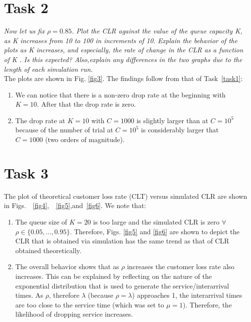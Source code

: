 \documentclass[10pt]{article}
\newcommand{\tion}[1]{Task~\ref{#1}}
\begin{document}
\section{Task 2}
\label{task2}



\textit{Now let us fix $\rho = 0.85$. Plot the CLR against the value of the queue capacity K, as K increases from 10 to 100 in increments of 10. Explain the behavior of the plots as K increases, and especially, the rate of change in the CLR as a function of K . Is this expected? Also,explain any differences in the two graphs due to the length of each simulation run.} \\
The plots are shown in Fig. \ref{fig3}. The findings follow from that of \tion{task1}: 
\begin{enumerate}
 \item We can notice that there is a non-zero drop rate at the beginning with $K=10$. After that the drop rate is zero.
 \item The drop rate at $K=10$ with $C=1000$ is slightly larger than at $C=10^5$ because of the number of trial at $C=10^5$ is considerably larger that $C=1000$ (two orders of magnitude).
\end{enumerate}

\section{Task 3}
\label{task3}


The plot of theoretical customer loss rate (CLT) versus simulated CLR are shown in Figs.~~\ref{fig4},~~\ref{fig5},and~\ref{fig6}. We note that: 
\begin{enumerate}
\item The queue size of $K=20$ is too large and the simulated CLR is zero $\forall$ $\rho\in\{0.05,\ldots,0.95\}$. Therefore, Figs. \ref{fig5} and \ref{fig6} are shown to depict the CLR that is obtained via simulation has the same trend as that of CLR obtained theoretically.

\item The overall behavior shows that as $\rho$ increases the customer loss rate also increases. This can be explained by reflecting on the nature of the exponential distribution that is used to generate the service/interarrival times. As $\rho$, therefore $\lambda$ (because $\rho=\lambda$) approaches 1, the interarrival times are too close to the service time (which was set to $\mu=1$). Therefore, the likelihood of dropping service increases.
\end{enumerate}
\end{document}
